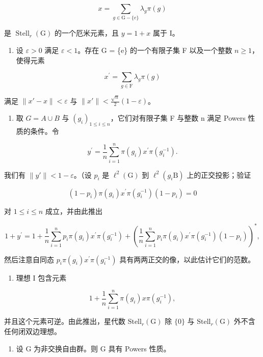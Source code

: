 \[
x = \sum_ {g \in \mathrm{G} - \{e \}} \lambda_ {g} \pi (g)
\]

是 \(\operatorname{Stell}_{r}(\mathrm{G})\) 的一个厄米元素，且 \(y = 1 + x\) 属于 I。

\begin{enumerate}
\def\labelenumi{\alph{enumi})}
\setcounter{enumi}{1}
\tightlist
\item
  设 \(\varepsilon > 0\) 满足 \(\varepsilon < 1\)。存在 G = \{e\} 的一个有限子集 F 以及一个整数 \(n \geqslant 1\)，使得元素
\end{enumerate}

\[
x ^ {\prime} = \sum_ {g \in \mathrm{F}} \lambda_ {g} \pi (g)
\]

满足 \(\|x' - x\| < \varepsilon\) 与 \(\|x'\| < \frac{\sqrt{n}}{2}(1 - \varepsilon)\)。

\begin{enumerate}
\def\labelenumi{\alph{enumi})}
\setcounter{enumi}{2}
\tightlist
\item
  取 \(G = A \cup B\) 与 \((g_{i})_{1 \leqslant i \leqslant n}\)，它们对有限子集 F 与整数 n 满足 Powers 性质的条件。令
\end{enumerate}

\[
y ^ {\prime} = \frac {1}{n} \sum_ {i = 1} ^ {n} \pi (g _ {i}) x ^ {\prime} \pi (g _ {i} ^ {- 1}).
\]

我们有 \(\|y'\| < 1 - \varepsilon\)。（设 \(p_i\) 是 \(\ell^{2}(\mathrm{G})\) 到 \(\ell^{2}(g_{i}\mathrm{B})\) 上的正交投影；验证

\[
(1 - p _ {i}) \pi (g _ {i}) x ^ {\prime} \pi (g _ {i} ^ {- 1}) (1 - p _ {i}) = 0
\]

对 \(1 \leqslant i \leqslant n\) 成立，并由此推出

\[
1 + y ^ {\prime} = 1 + \frac {1}{n} \sum_ {i = 1} ^ {n} p _ {i} \pi (g _ {i}) x ^ {\prime} \pi (g _ {i} ^ {- 1}) + \left(\frac {1}{n} \sum_ {i = 1} ^ {n} p _ {i} \pi (g _ {i}) x ^ {\prime} \pi (g _ {i} ^ {- 1}) (1 - p _ {i})\right) ^ {*},
\]

然后注意自同态 \(p_{i}\pi(g_{i})x^{\prime}\pi(g_{i}^{-1})\) 具有两两正交的像，以此估计它们的范数。

\begin{enumerate}
\def\labelenumi{\alph{enumi})}
\setcounter{enumi}{3}
\tightlist
\item
  理想 I 包含元素
\end{enumerate}

\[
1 + \frac {1}{n} \sum_ {i = 1} ^ {n} \pi (g _ {i}) x \pi (g _ {i} ^ {- 1}),
\]

并且这个元素可逆。由此推出，星代数 \(\text{Stell}_{r}(\text{G})\) 除 \(\{0\}\) 与 \(\text{Stell}_{r}(\text{G})\) 外不含任何闭双边理想。

\begin{enumerate}
\def\labelenumi{\alph{enumi})}
\setcounter{enumi}{4}
\tightlist
\item
  设 G 为非交换自由群。则 G 具有 Powers 性质。
\end{enumerate}
